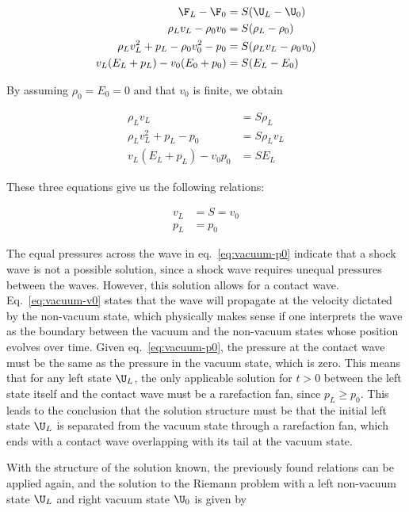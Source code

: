 \begin{align}
    \F_L - \F_0 &= S (\U_L - \U_0) \\
    \rho_L v_L - \rho_0 v_0  &= S( \rho_L - \rho_0) \label{eq:vacuum1} \\
    \rho_L v_L^2 + p_L - \rho_0 v_0^2 - p_0  &= S( \rho_L v_L - \rho_0 v_0) \label{eq:vacuum2} \\
    v_L (E_L + p_L) - v_0 (E_0 + p_0) &= S( E_L - E_0) \label{eq:vacuum3}
\end{align}

By assuming $\rho_0 = E_0 = 0$ and that $v_0$ is finite, we obtain


\begin{align}
    \rho_L v_L  &= S \rho_L \label{eq:vacuum4} \\
    \rho_L v_L^2 + p_L - p_0  &= S \rho_L v_L \label{eq:vacuum5} \\
    v_L (E_L + p_L) - v_0 p_0 &= S E_L \label{eq:vacuum6}
\end{align}

These three equations give us the following relations:

\begin{align}
    v_L &= S = v_0 \label{eq:vacuum-v0}\\
    p_L &= p_0 \label{eq:vacuum-p0}
\end{align}

The equal pressures across the wave in eq.~\ref{eq:vacuum-p0} indicate that a shock wave is not a
possible solution, since a shock wave requires unequal pressures between the waves. However,
this solution allows for a contact wave. Eq.~\ref{eq:vacuum-v0} states that the wave will propagate
at the velocity dictated by the non-vacuum state, which physically makes sense if one interprets the
wave as the boundary between the vacuum and the non-vacuum states whose position evolves over time.
Given eq.~\ref{eq:vacuum-p0}, the pressure at the contact wave must be the same as the pressure in
the vacuum state, which is zero. This means that for any left state $\U_L$, the only applicable
solution for $t > 0$ between the left state itself and the contact wave must be a rarefaction fan,
since $p_L \geq p_0$. This leads to the conclusion that the solution structure must be that the
initial left state $\U_L$ is separated from the vacuum state through a rarefaction fan, which ends
with a contact wave overlapping with its tail at the vacuum state.

With the structure of the solution known, the previously found relations can be applied again, and
the solution to the Riemann problem with a left non-vacuum state $\U_L$ and right vacuum state
$\U_0$ is given by

